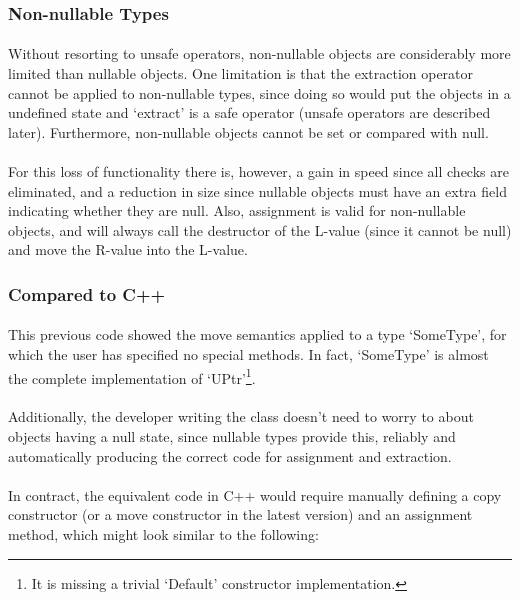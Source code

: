 \documentclass[12pt,twoside,notitlepage]{report}
\begin{document}
\subsubsection{Non-nullable Types}

\paragraph{}
Without resorting to unsafe operators, non-nullable objects are considerably more limited than nullable objects. One limitation is that the extraction operator cannot be applied to non-nullable types, since doing so would put the objects in a undefined state and `extract' is a safe operator (unsafe operators are described later). Furthermore, non-nullable objects cannot be set or compared with null.

\paragraph{}
For this loss of functionality there is, however, a gain in speed since all checks are eliminated, and a reduction in size since nullable objects must have an extra field indicating whether they are null. Also, assignment is valid for non-nullable objects, and will always call the destructor of the L-value (since it cannot be null) and move the R-value into the L-value.

\subsubsection{Compared to C++}

\paragraph{}
This previous code showed the move semantics applied to a type `SomeType', for which the user has specified no special methods. In fact, `SomeType' is almost the complete implementation of `UPtr'\footnote{It is missing a trivial `Default' constructor implementation.}.

\paragraph{}
Additionally, the developer writing the class doesn't need to worry to about objects having a null state, since nullable types provide this, reliably and automatically producing the correct code for assignment and extraction.

\paragraph{}
In contract, the equivalent code in C++ would require manually defining a copy constructor (or a move constructor in the latest version) and an assignment method, which might look similar to the following:
\end{document}
